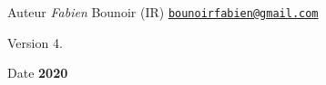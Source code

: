 \begin{DoxyAuthor}{Auteur}
{\itshape Fabien} Bounoir (IR) \href{mailto:bounoirfabien@gmail.com}{\tt bounoirfabien@gmail.\+com} 
\end{DoxyAuthor}
\begin{DoxyVersion}{Version}
4. 
\end{DoxyVersion}
\begin{DoxyDate}{Date}
{\bfseries 2020} 
\end{DoxyDate}
